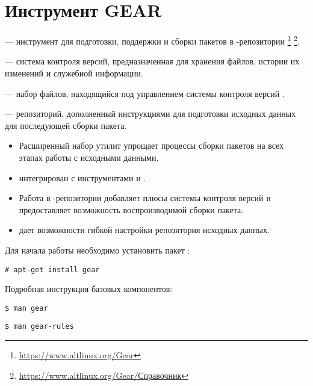 \hypertarget{4}{\chapter{Инструмент GEAR}}\label{chapter-gear}
 ---
инструмент для подготовки, поддержки и сборки пакетов в -репозитории%
\footnote{\href{https://www.altlinux.org/Gear}{https://www.altlinux.org/Gear}}%
\footnote{\href{https://www.altlinux.org/Gear/\%D0\%A1\%D0\%BF\%D1\%80\%D0\%B0\%D0\%B2\%D0\%BE\%D1\%87\%D0\%BD\%D0\%B8\%D0\%BA}{https://www.altlinux.org/Gear/Справочник}}.


 --- система контроля версий, предназначенная для хранения файлов, истории
их изменений и служебной информации.

 --- набор файлов, находящийся под управлением системы
контроля версий .

 ---   репозиторий, дополненный 
 инструкциями для подготовки исходных данных для последующей сборки пакета.

\begin{itemize}
	\item Расширенный набор утилит упрощает процессы сборки пакетов на всех этапах работы с исходными данными.
	\item {} интегрирован с инструментами  и .
	\item Работа в  -репозитории добавляет плюсы системы контроля версий и предоставляет возможность
	воспроизводимой сборки пакета.
	\item  {} дает возможности гибкой настройки репозитория исходных данных.
\end{itemize}

Для начала работы необходимо установить пакет :
\begin{verbatim}
# apt-get install gear
\end{verbatim}

Подробная инструкция базовых компонентов:
 \begin{verbatim}
$ man gear
\end{verbatim}

\begin{verbatim}
$ man gear-rules
\end{verbatim}

